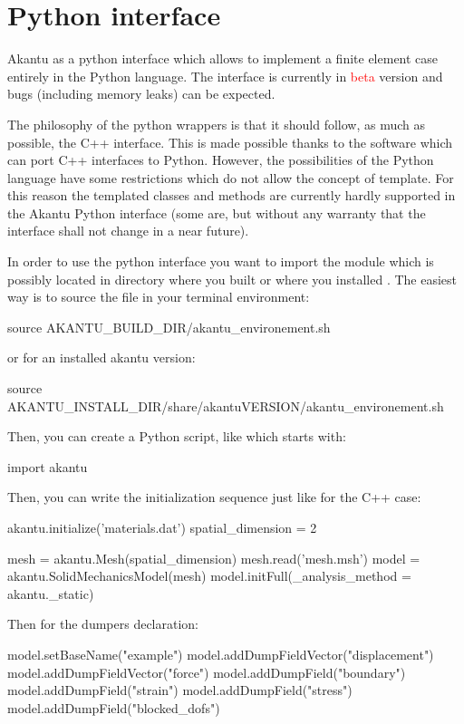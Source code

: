 \chapter{Python interface\label{sect:python}}

Akantu as a python interface which allows to implement a finite
element case entirely in the Python language.  The interface is
currently in \textcolor{red}{beta} version and bugs (including memory
leaks) can be expected.

The philosophy of the python wrappers is that it should follow, as
much as possible, the C++ interface. This is made possible thanks to
the \href{SWIG}{} software which can port C++ interfaces to Python.
However, the possibilities of the Python language have some
restrictions which do not allow the concept of template. For this
reason the templated classes and methods are currently hardly
supported in the Akantu Python interface (some are, but without any
warranty that the interface shall not change in a near future).

In order to use the python interface you want to import the
 module which is possibly located in directory where you
built or where you installed \akantu.  The easiest way is to source
the file  in your terminal environment:

\begin{command}
  source AKANTU_BUILD_DIR/akantu_environement.sh
\end{command}

or for an installed akantu version:

\begin{command}
  source AKANTU_INSTALL_DIR/share/akantuVERSION/akantu_environement.sh
\end{command}

Then, you can create a Python script, like  which
starts with:

\begin{python}
  import akantu
\end{python}

Then, you can write the initialization sequence just like for the C++
case:

\begin{python}
  akantu.initialize('materials.dat') spatial_dimension = 2
   
  mesh = akantu.Mesh(spatial_dimension) mesh.read('mesh.msh')
  model = akantu.SolidMechanicsModel(mesh)
  model.initFull(_analysis_method = akantu._static)
\end{python}
Then for the dumpers declaration:
\begin{python}
  model.setBaseName("example") model.addDumpFieldVector("displacement")
  model.addDumpFieldVector("force") model.addDumpField("boundary")
  model.addDumpField("strain") model.addDumpField("stress")
  model.addDumpField("blocked_dofs")
\end{python}

